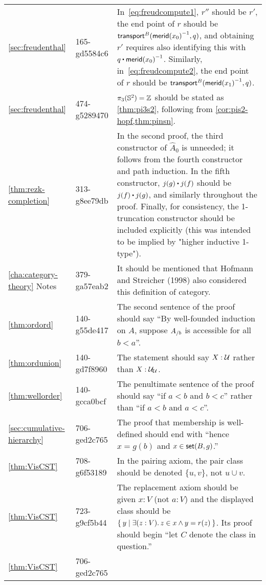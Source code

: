 \documentclass[
%
%
11pt %
]{article}
\begin{document}
\begin{longtable}{llp{10.5cm}}
  \cref{sec:freudenthal}
  & 165-gd5584c6
  & In~\eqref{eq:freudcompute1}, $r''$ should be $r'$, the end point of $r$ should be $\mathsf{transport}^{B}(\mathord{{\mathsf{merid}(x_0)}^{-1}},q)$, and obtaining $r'$ requires also identifying this with $q \ct \opp{\merid(x_0)}$.
  Similarly, in~\eqref{eq:freudcompute2}, the end point of $r$ should be $\mathsf{transport}^{B}(\mathord{{\mathsf{merid}(x_1)}^{-1}},q)$.\\
  \cref{sec:freudenthal}
  & 474-g5289470
  & $\pi_3(\mathbb{S}^2)=\mathbb{Z}$ should be stated as \cref{thm:pi3s2}, following from \cref{cor:pis2-hopf,thm:pinsn}.\\
  \cref{thm:rezk-completion}
  & 313-g8ee79db
  & In the second proof, the third constructor of $\widehat A_0$ is unneeded; it follows from the fourth constructor and path induction.
  In the fifth constructor, $j(g)\ct j(f)$ should be $j(f)\ct j(g)$, and similarly throughout the proof.
  Finally, for consistency, the 1-truncation constructor should be included explicitly (this was intended to be implied by "higher inductive 1-type").\\
  \cref{cha:category-theory} Notes
  & 379-ga57eab2
  & It should be mentioned that Hofmann and Streicher (1998) also considered this definition of category.\\
  \cref{thm:ordord}
  & 140-g55de417
  & The second sentence of the proof should say ``By well-founded induction on $A$, suppose ${A}_{/b}$ is accessible for all $b<a$''.\\
  \cref{thm:ordunion}
  & 140-gd7f8960
  & The statement should say $X:\mathcal{U}$ rather than $X:\mathcal{U}_\mathcal{U}$.\\
  \cref{thm:wellorder}
  & 140-gcca0bcf
  & The penultimate sentence of the proof should say ``if $a<b$ and $b<c$'' rather than ``if $a<b$ and $a<c$''.\\
  \cref{sec:cumulative-hierarchy}
  & 706-ged2c765
  & The proof that membership is well-defined should end with ``hence $x = g(b)$ and $x \in \mathsf{set}(B,g)$.''\\
  \cref{thm:VisCST}
  & 708-g6f53189
  & In the pairing axiom, the pair class should be denoted $\{u, v\}$, not $u\cup v$.\\
  \cref{thm:VisCST}
  & 723-g9cf5b44
  & The replacement axiom should be given $x : V$ (not $a : V$) and the displayed class should be $\setof{ y | \exis{z : V} z \in x \land y = r(z)}$.
  Its proof should begin ``let $C$ denote the class in question.''\\
  \cref{thm:VisCST}
  & 706-ged2c765

\end{longtable}
\end{document}
